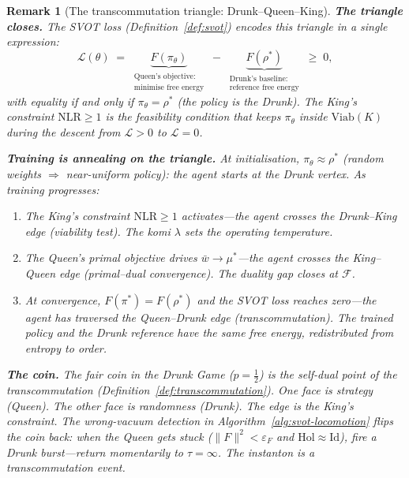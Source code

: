 \documentclass[11pt,a4paper]{article}
\newtheorem{remark}[theorem]{Remark}
\newcommand{\cL}{\mathcal{L}}
\newcommand{\cF}{\mathcal{F}}
\begin{document}
\begin{remark}[The transcommutation triangle:
  Drunk--Queen--King]
\noindent
\textbf{The triangle closes.}\;
The SVOT loss (Definition~\ref{def:svot})
encodes this triangle in a single expression:
\begin{equation}\label{eq:svot-triangle}
  \cL(\theta)
  \;=\;
  \underbrace{F(\pi_\theta)}_
    {\substack{\text{Queen's objective:}\\\text{minimise free energy}}}
  \;-\;
  \underbrace{F(\rho^*)}_
    {\substack{\text{Drunk's baseline:}\\\text{reference free energy}}}
  \;\geq\; 0,
\end{equation}
with equality if and only if $\pi_\theta = \rho^*$
(the policy \emph{is} the Drunk).
The King's constraint $\mathrm{NLR} \geq 1$
is the feasibility condition that keeps $\pi_\theta$
inside $\mathrm{Viab}(K)$ during the descent from
$\cL > 0$ to $\cL = 0$.

\medskip\noindent
\textbf{Training is annealing on the triangle.}\;
At initialisation, $\pi_\theta \approx \rho^*$
(random weights $\Rightarrow$ near-uniform policy):
the agent starts at the Drunk vertex.
As training progresses:
\begin{enumerate}[label=(\roman*),nosep]
\item The King's constraint $\mathrm{NLR} \geq 1$
  activates---the agent crosses the
  Drunk--King edge (viability test).
  The komi $\lambda$ sets the operating temperature.
\item The Queen's primal objective drives
  $\bar{w} \to \mu^*$---the agent crosses the
  King--Queen edge (primal--dual convergence).
  The duality gap closes at $\cF$.
\item At convergence, $F(\pi^*) = F(\rho^*)$ and
  the SVOT loss reaches zero---the agent
  has traversed the Queen--Drunk edge
  (transcommutation).
  The trained policy and the Drunk reference have
  the \emph{same free energy},
  redistributed from entropy to order.
\end{enumerate}

\medskip\noindent
\textbf{The coin.}\;
The fair coin in the Drunk Game ($p = \tfrac{1}{2}$)
is the self-dual point of the transcommutation
(Definition~\ref{def:transcommutation}).
One face is strategy (Queen).
The other face is randomness (Drunk).
The edge is the King's constraint.
The wrong-vacuum detection in
Algorithm~\ref{alg:svot-locomotion}
flips the coin back:
when the Queen gets stuck
($\|F\|^2 < \varepsilon_F$ and
$\mathrm{Hol} \approx \mathrm{Id}$),
fire a Drunk burst---return momentarily to
$\tau = \infty$.
The instanton is a transcommutation event.
\end{remark}
\end{document}
